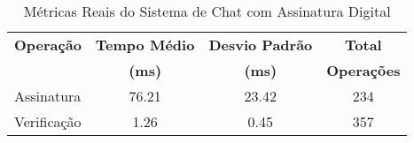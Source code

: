 \begin{table}[h]
\centering
\caption{Métricas Reais do Sistema de Chat com Assinatura Digital}
\label{tab:real_chat_metrics}
\begin{tabular}{|l|c|c|c|}
\hline
\textbf{Operação} & \textbf{Tempo Médio} & \textbf{Desvio Padrão} & \textbf{Total} \\
& \textbf{(ms)} & \textbf{(ms)} & \textbf{Operações} \\
\hline
Assinatura & 76.21 & 23.42 & 234 \\
Verificação & 1.26 & 0.45 & 357 \\
\hline
\end{tabular}
\end{table}